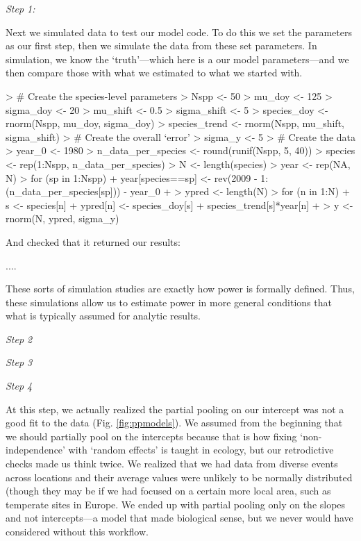 \documentclass[11pt]{article}
\begin{document}
\emph{Step 1:}
 
Next we simulated data to test our model code. To do this we set the parameters as our first step, then we simulate the data  from these set parameters. In simulation, we know the `truth'---which here is a our model parameters---and we then compare those with what we estimated to what we started with.
 
\begin{Schunk}
\begin{Sinput}
>  # Create the species-level parameters
> Nspp <- 50
> mu_doy <- 125
> sigma_doy <- 20
> mu_shift <- 0.5
> sigma_shift <- 5
> species_doy <- rnorm(Nspp, mu_doy, sigma_doy)
> species_trend <- rnorm(Nspp, mu_shift, sigma_shift)
> # Create the overall `error'
> sigma_y <- 5
> # Create the data
> year_0 <- 1980
> n_data_per_species <- round(runif(Nspp, 5, 40))
> species <- rep(1:Nspp, n_data_per_species)
> N <- length(species)
> year <- rep(NA, N)
> for (sp in 1:Nspp){
+   year[species==sp] <- rev(2009 - 1:(n_data_per_species[sp])) - year_0
+ }
> ypred <- length(N)
> for (n in 1:N){
+   s <- species[n]
+   ypred[n] <- species_doy[s] + species_trend[s]*year[n]
+ }
> y <- rnorm(N, ypred, sigma_y)
\end{Sinput}
\end{Schunk}

 And checked that it returned our results:
 
 ....


These sorts of simulation studies are  exactly how power is formally defined. Thus, these simulations allow us to estimate power in more general conditions that what is typically assumed for analytic results.

\emph{Step 2}

\emph{Step 3}

\emph{Step 4}

At this step, we actually realized the partial pooling on our intercept was not a good fit to the data (Fig. \ref{fig:ppmodels}). We assumed from the beginning that we should partially pool on the intercepts because that is how fixing `non-independence' with `random effects' is taught in ecology, but our retrodictive checks made us think twice. We realized that we had data from diverse events across locations and their average values were unlikely to be normally distributed (though they may be if we had focused on a certain more local area, such as temperate sites in Europe. We ended up with partial pooling only on the slopes and not intercepts---a model that made biological sense, but we never would have considered without this workflow. 
\end{document}
